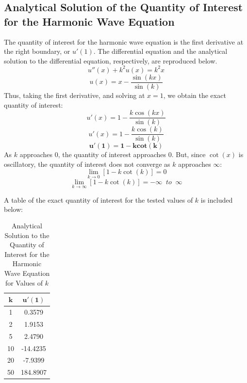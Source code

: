 \documentclass[10pt]{article}		%
\numberwithin{equation}{section}
\begin{document}
\newpage

\subsection{Analytical Solution of the Quantity of Interest for the Harmonic Wave Equation}

The quantity of interest for the harmonic wave equation is the first derivative at the right boundary, or $u'(1)$. The differential equation and the analytical solution to the differential equation, respectively, are reproduced below.
\begin{equation}
u''(x)+k^2u(x)=k^2x
\end{equation}
\begin{equation}
u(x) = x - \frac{\sin(kx)}{\sin(k)}
\end{equation}
Thus, taking the first derivative, and solving at $x = 1$, we obtain the exact quantity of interest:
\begin{equation}
u'(x) = 1 - \frac{k\cos(kx)}{\sin(k)}
\end{equation}
\begin{equation}
u'(x) = 1 - \frac{k\cos(k)}{\sin(k)}
\end{equation}
\begin{equation}
\mathbf{u'(1) = 1 - kcot(k)}
\end{equation}
As $k$ approaches 0, the quantity of interest approaches 0. But, since $\cot(x)$ is oscillatory, the quantity of interest does not converge as $k$ approaches $\infty$:
\begin{equation}
\lim_{k\to 0} [1 - k\cot(k)] = 0
\end{equation}
\begin{equation}
\lim_{k\to\infty} [1 - k\cot(k)] = -\infty \;\; to \;\; \infty
\end{equation}

A table of the exact quantity of interest for the tested values of $k$ is included below:
\begin{table}[H]
	\caption{Analytical Solution to the Quantity of Interest for the Harmonic Wave Equation for Values of $k$}
	\begin{tabular}{|c|c|}
	\hline 
	$\mathbf{k}$ & $\mathbf{u'(1)}$ \\ 
	\hline 
	1 & 0.3579 \\ 
	\hline 
	2 & 1.9153 \\ 
	\hline 
	5 & 2.4790 \\ 
	\hline 
	10 & -14.4235 \\ 
	\hline 
	20 & -7.9399 \\ 
	\hline 
	50 & 184.8907 \\ 
	\hline 
\end{tabular}
\end{table} 
\end{document}

